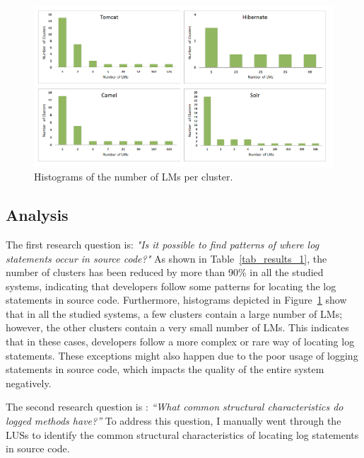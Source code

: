 \begin{figure} [p]
    \centering
  \centering\includegraphics [width = 1\textwidth, height = 0.5\textheight] {Charts/Histograms.png}
  \caption{Histograms of the number of LMs per cluster.}
  \label{fig:histograms}
\end{figure}


\subsection{Analysis}  \label{analysis}
The first research question is: \emph{"Is it possible to find patterns of where log statements occur in source code?"} As shown in Table~\ref{tab_results_1}, the number of clusters has been reduced by more than 90\% in all the studied systems, indicating that developers follow some patterns for locating the log statements in source code. Furthermore, histograms depicted in Figure~\ref{fig:histograms} show that in all the studied systems, a few clusters contain a large number of LMs; however, the other clusters contain a very small number of LMs. This indicates that in these cases, developers follow a more complex or rare way of locating log statements. These exceptions might also happen due to the poor usage of logging statements in source code, which impacts the quality of the entire system negatively.

The second research question is : \emph{``What common structural characteristics do logged methods have?''}
To address this question, I manually went through the LUSs to identify the common structural characteristics of locating log statements in source code.


